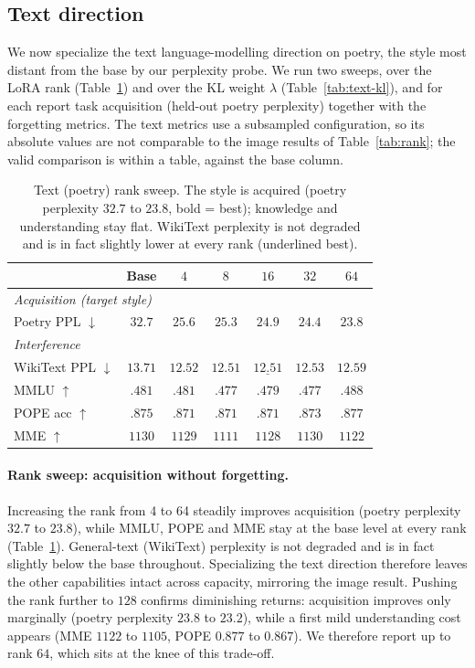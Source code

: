 \documentclass{article}
\begin{document}
\subsection{Text direction}
\label{sec:text}
We now specialize the text language-modelling direction on poetry, the style most
distant from the base by our perplexity probe. We run two sweeps, over the LoRA
rank (Table~\ref{tab:text}) and over the KL weight $\lambda$
(Table~\ref{tab:text-kl}), and for each report task acquisition (held-out poetry
perplexity) together with the forgetting metrics. The text metrics use a
subsampled configuration, so its absolute values are not comparable to the image results of Table~\ref{tab:rank}; the valid comparison is within a table, against
the base column.

\begin{table}[t]
\centering\small
\setlength{\tabcolsep}{7pt}
\begin{tabular}{lcccccc}
\toprule
 & \textbf{Base} & $4$ & $8$ & $16$ & $32$ & $64$ \\
\midrule
\multicolumn{7}{l}{\textit{Acquisition (target style)}}\\
Poetry PPL $\downarrow$   & $32.7$ & $25.6$ & $25.3$ & $24.9$ & $24.4$ & $\mathbf{23.8}$ \\
\midrule
\multicolumn{7}{l}{\textit{Interference}}\\
WikiText PPL $\downarrow$ & $13.71$ & $12.52$ & $12.51$ & $\underline{12.51}$ & $12.53$ & $12.59$ \\
MMLU $\uparrow$           & $.481$ & $.481$ & $.477$ & $.479$ & $.477$ & $.488$ \\
POPE acc $\uparrow$       & $.875$ & $.871$ & $.871$ & $.871$ & $.873$ & $.877$ \\
MME $\uparrow$            & $1130$ & $1129$ & $1111$ & $1128$ & $1130$ & $1122$ \\
\bottomrule
\end{tabular}
\caption{Text (poetry) rank sweep. The style is acquired (poetry perplexity
$32.7$ to $23.8$, bold = best); knowledge and understanding stay flat. WikiText
perplexity is not degraded and is in fact slightly lower at every rank
(underlined best).}
\label{tab:text}
\end{table}

\paragraph{Rank sweep: acquisition without forgetting.}
Increasing the rank from 4 to 64 steadily improves acquisition (poetry perplexity
$32.7$ to $23.8$), while MMLU, POPE and MME stay at the base level at every rank
(Table~\ref{tab:text}). General-text (WikiText) perplexity is not degraded and is
in fact slightly below the base throughout. Specializing the text direction
therefore leaves the other capabilities intact across capacity, mirroring the
image result.
Pushing the rank further to $128$ confirms diminishing returns: acquisition improves
only marginally (poetry perplexity $23.8$ to $23.2$), while a first mild understanding
cost appears (MME $1122$ to $1105$, POPE $0.877$ to $0.867$). We therefore report up to
rank $64$, which sits at the knee of this trade-off.
\end{document}
